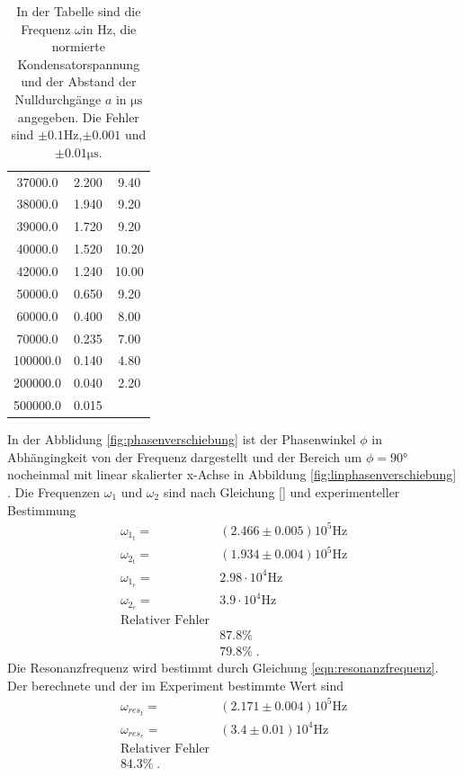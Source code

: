 \begin{table}
\begin{tabular}{c c c}
       37000.0  &  2.200  &  9.40  \\
       38000.0  &  1.940  &  9.20  \\
       39000.0  &  1.720  &  9.20  \\
       40000.0  &  1.520  & 10.20  \\
       42000.0  &  1.240  & 10.00  \\
       50000.0  &  0.650  &  9.20  \\
       60000.0  &  0.400  &  8.00  \\
       70000.0  &  0.235  &  7.00  \\
      100000.0  &  0.140  &  4.80  \\
      200000.0  &  0.040  &  2.20  \\
      500000.0  &  0.015  &        \\
  \end{tabular}
  \caption{In der Tabelle sind die Frequenz $\omega$in $\si{\hertz}$, die normierte
  Kondensatorspannung und der Abstand der Nulldurchgänge $a$ in $\si{\micro\second}$
   angegeben. Die Fehler sind $\pm0.1\si{\hertz}$,$ \pm0.001$ und
   $\pm0.01\si{\micro\second}$.}

  \label{fig:Messwerte}
\end{table}
In der Abblidung \ref{fig:phasenverschiebung} ist der Phasenwinkel $\phi$ in Abhängingkeit
von der Frequenz dargestellt und der Bereich um $\phi=90°$ nocheinmal mit
linear skalierter x-Achse in Abbildung \ref{fig:linphasenverschiebung} . Die
Frequenzen $\omega_{1}$ und
$\omega_{2}$  sind nach Gleichung \eqref{} und experimenteller Bestimmung
\begin{align*}
  \omega_{1_t}=&( 2.466\pm0.005)10^5\si{\hertz}\\
  \omega_{2_t}=&(1.934\pm0.004)10^5\si{\hertz}\\
  \omega_{1_e}=&2.98 \cdot10^4\si{\hertz}\\
  \omega_{2_e}=&3.9 \cdot10^4\si{\hertz}\\
  \text{Relativer Fehler}\\
   &87.8\%\\
   &79.8\%\;.
\end{align*}
Die Resonanzfrequenz wird bestimmt durch Gleichung \eqref{eqn:resonanzfrequenz}.
Der berechnete und der im Experiment bestimmte Wert sind
\begin{align*}
\omega_{res_t}=&(2.171\pm0.004)10^5\si{\hertz}\\
\omega_{res_e}=&(3.4\pm0.01)10^4\si{\hertz}\\
\text{Relativer Fehler}\\
84.3\%\;.
\end{align*}
